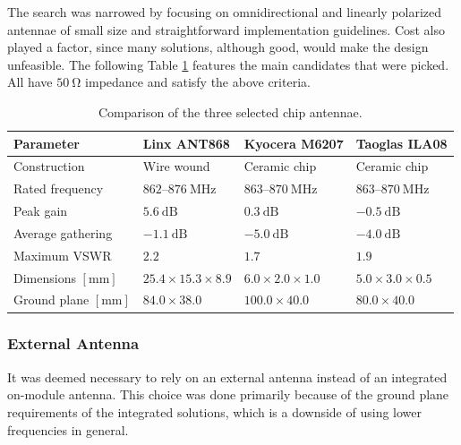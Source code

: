 The search was narrowed by focusing on omnidirectional and linearly polarized antennae of small size and straightforward implementation guidelines. Cost also played a factor, since many solutions, although good, would make the design unfeasible. The following Table \ref{table:antenna-chip} features the main candidates that were picked. All have $50~\mathrm{\Omega}$ impedance and satisfy the above criteria.

\begin{table}
\begin{center}
\caption{\label{table:antenna-chip}Comparison of the three selected chip antennae.}
    \begin{tabular}{|l|l|l|l|} \hline
    \textbf{Parameter} & \textbf{Linx ANT868}\cite{linx_technologies_he_2024} & \textbf{Kyocera M6207}\cite{kyocera_ism_2024} & \textbf{Taoglas ILA08}\cite{taoglas_ila08_nodate} \\ \hline
    Construction & Wire wound & Ceramic chip & Ceramic chip \\ \hline
    Rated frequency                 & $862 \text{--} 876~\mathrm{MHz}$ & $863 \text{--} 870~\mathrm{MHz}$ & $863 \text{--} 870~\mathrm{MHz}$ \\ \hline
    Peak gain                       & $5.6~\mathrm{dB}$     & $0.3~\mathrm{dB}$     & $-0.5~\mathrm{dB}$ \\ \hline
    Average gathering               & $-1.1~\mathrm{dB}$    & $-5.0~\mathrm{dB}$    & $-4.0~\mathrm{dB}$ \\ \hline
    Maximum VSWR                    & $2.2$                 & $1.7$                 & $1.9$ \\ \hline
    Dimensions $\mathrm{[mm]}$      & $25.4 \times 15.3 \times 8.9$ & $6.0 \times 2.0 \times 1.0$ & $5.0 \times 3.0 \times 0.5$ \\ \hline
    Ground plane $\mathrm{[mm]}$    & $84.0 \times 38.0$ & $100.0 \times 40.0$ & $80.0 \times 40.0$ \\ \hline
    \end{tabular}
\end{center}
\end{table}

\subsubsection{External Antenna}
It was deemed necessary to rely on an external antenna instead of an integrated on-module antenna. This choice was done primarily because of the ground plane requirements of the integrated solutions, which is a downside of using lower frequencies in general.

